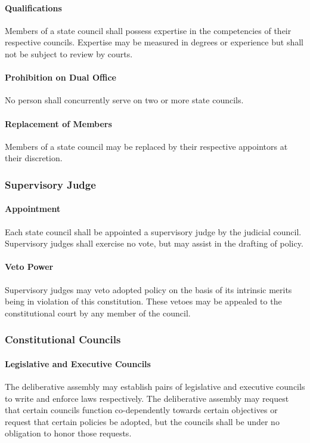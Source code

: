 \documentclass{article}
\begin{document}
\paragraph{Qualifications}
Members of a state council shall possess expertise in the competencies of their respective councils. Expertise may be measured in degrees or experience but shall not be subject to review by courts.
\paragraph{Prohibition on Dual Office}
No person shall concurrently serve on two or more state councils.
\paragraph{Replacement of Members}
Members of a state council may be replaced by their respective appointors at their discretion.
\subsubsection{Supervisory Judge}
\paragraph{Appointment}
Each state council shall be appointed a supervisory judge by the judicial council. Supervisory judges shall exercise no vote, but may assist in the drafting of policy.
\paragraph{Veto Power}
Supervisory judges may veto adopted policy on the basis of its intrinsic merits being in violation of this constitution. These vetoes may be appealed to the constitutional court by any member of the council.
\subsubsection{Constitutional Councils}
\paragraph{Legislative and Executive Councils}
The deliberative assembly may establish pairs of legislative and executive councils to write and enforce laws respectively. The deliberative assembly may request that certain councils function co-dependently towards certain objectives or request that certain policies be adopted, but the councils shall be under no obligation to honor those requests.
\end{document}
